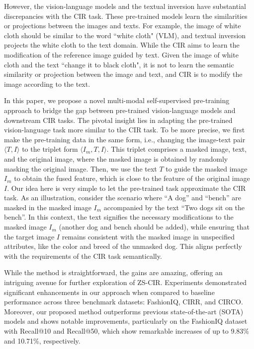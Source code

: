 \documentclass[10pt,twocolumn,letterpaper]{article}
\begin{document}
However, the vision-language models and the textual inversion have substantial discrepancies with the CIR task. These pre-trained models learn the similarities or projections between the images and texts. For example, the image of white cloth should be similar to the word ``white cloth" (VLM), and textual inversion projects the white cloth to the text domain. While the CIR aims to learn the modification of the reference image guided by text. Given the image of white cloth and the text ``change it to black cloth", it is not to learn the semantic similarity or projection between the image and text, and CIR is to modify the image according to the text. 

In this paper, we propose a novel multi-modal self-supervised pre-training approach to bridge the gap between pre-trained vision-language models and downstream CIR tasks. The pivotal insight lies in adapting the pre-trained vision-language task more similar to the CIR task. To be more precise, we first make the pre-training data in the same form, i.e., changing the image-text pair $\langle T, I \rangle$  to the triplet form  $\langle I_m, T, I \rangle$. This triplet comprises a masked image, text, and the original image, where the masked image is obtained by randomly masking the original image. Then, we use the text $T$ to guide the masked image $I_m$ to obtain the fused feature, which is close to the feature of the original image $I$. Our idea here is very simple to let the pre-trained task approximate the CIR task. As an illustration, consider the scenario where ``A dog'' and ``bench'' are masked in the masked image $I_m$ accompanied by the text ``Two dogs sit on the bench''. In this context, the text signifies the necessary modifications to the masked image $I_m$ (another dog and bench should be added), while ensuring that the target image $I$ remains consistent with the masked image in unspecified attributes, like the color and breed of the unmasked dog. This aligns perfectly with the requirements of the CIR task semantically. 

While the method is straightforward, the gains are amazing, offering an intriguing avenue for further exploration of ZS-CIR. Experiments demonstrated significant enhancements in our approach when compared to baseline performance across three benchmark datasets: FashionIQ, CIRR, and CIRCO. Moreover, our proposed method outperforms previous state-of-the-art (SOTA) models and shows notable improvements, particularly on the FashionIQ dataset with Recall@10 and Recall@50, which show remarkable increases of up to 9.83\% and 10.71\%, respectively.
\end{document}
